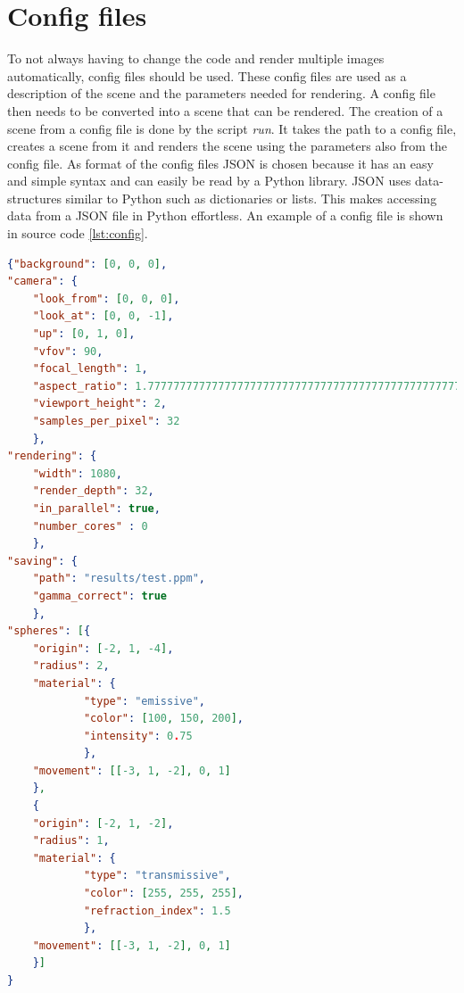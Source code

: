 \documentclass[12pt]{report}
\begin{document}
\chapter{Config files}
To not always having to change the code and render multiple images automatically, config files should be used. These config files are used as a description of the scene and the parameters needed for rendering. A config file then needs to be converted into a scene that can be rendered. The creation of a scene from a config file is done by the script \textit{run}. It takes the path to a config file, creates a scene from it and renders the scene using the parameters also from the config file. As format of the config files JSON is chosen because it has an easy and simple syntax and can easily be read by a Python library. JSON uses data-structures similar to Python such as dictionaries or lists. This makes accessing data from a JSON file in Python effortless. An example of a config file is shown in source code \ref{lst:config}.
\begin{lstlisting}[caption={Config file example}, label=lst:config, language=json]
{"background": [0, 0, 0],
"camera": {
	"look_from": [0, 0, 0],
	"look_at": [0, 0, -1],
	"up": [0, 1, 0],
	"vfov": 90,
	"focal_length": 1,
	"aspect_ratio": 1.7777777777777777777777777777777777777777777777777777777777777777777777777777777777777777778,
	"viewport_height": 2,
	"samples_per_pixel": 32
	},
"rendering": {
	"width": 1080,
	"render_depth": 32,
	"in_parallel": true,
	"number_cores" : 0
	},
"saving": {
	"path": "results/test.ppm",
	"gamma_correct": true
	},
"spheres": [{
	"origin": [-2, 1, -4],
	"radius": 2,
	"material": {
			"type": "emissive",
			"color": [100, 150, 200],
			"intensity": 0.75
			},
	"movement": [[-3, 1, -2], 0, 1]
	},
	{
	"origin": [-2, 1, -2],
	"radius": 1,
	"material": {
			"type": "transmissive",
			"color": [255, 255, 255],
			"refraction_index": 1.5
			},
	"movement": [[-3, 1, -2], 0, 1]
	}]
}
\end{lstlisting}
\end{document}
